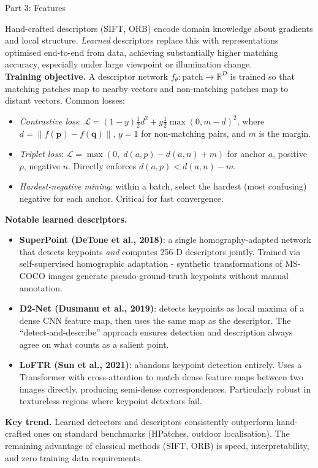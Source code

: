 \documentclass[letterpaper]{article}
\begin{document}
\begin{notes}{Part 3: Features}

Hand-crafted descriptors (SIFT, ORB) encode domain knowledge about gradients and local structure. \emph{Learned} descriptors replace this with representations optimised end-to-end from data, achieving substantially higher matching accuracy, especially under large viewpoint or illumination change.\\

\textbf{Training objective.} A descriptor network $f_\theta: \text{patch} \to \mathbb{R}^D$ is trained so that matching patches map to nearby vectors and non-matching patches map to distant vectors. Common losses:
\begin{itemize}
    \item \emph{Contrastive loss}: $\mathcal{L} = (1-y)\frac{1}{2}d^2 + y\frac{1}{2}\max(0, m-d)^2$, where $d = \|f(\mathbf{p}) - f(\mathbf{q})\|$, $y=1$ for non-matching pairs, and $m$ is the margin.
    \item \emph{Triplet loss}: $\mathcal{L} = \max(0,\; d(a,p) - d(a,n) + m)$ for anchor $a$, positive $p$, negative $n$. Directly enforces $d(a,p) < d(a,n) - m$.
    \item \emph{Hardest-negative mining}: within a batch, select the hardest (most confusing) negative for each anchor. Critical for fast convergence.
\end{itemize}

\textbf{Notable learned descriptors.}
\begin{itemize}
    \item \textbf{SuperPoint (DeTone et al., 2018)}: a single homography-adapted network that detects keypoints \emph{and} computes 256-D descriptors jointly. Trained via self-supervised homographic adaptation - synthetic transformations of MS-COCO images generate pseudo-ground-truth keypoints without manual annotation.
    \item \textbf{D2-Net (Dusmanu et al., 2019)}: detects keypoints as local maxima of a dense CNN feature map, then uses the same map as the descriptor. The ``detect-and-describe'' approach ensures detection and description always agree on what counts as a salient point.
    \item \textbf{LoFTR (Sun et al., 2021)}: abandons keypoint detection entirely. Uses a Transformer with cross-attention to match dense feature maps between two images directly, producing semi-dense correspondences. Particularly robust in textureless regions where keypoint detectors fail.
\end{itemize}

\textbf{Key trend.} Learned detectors and descriptors consistently outperform hand-crafted ones on standard benchmarks (HPatches, outdoor localisation). The remaining advantage of classical methods (SIFT, ORB) is speed, interpretability, and zero training data requirements.








\end{notes}
\end{document}
